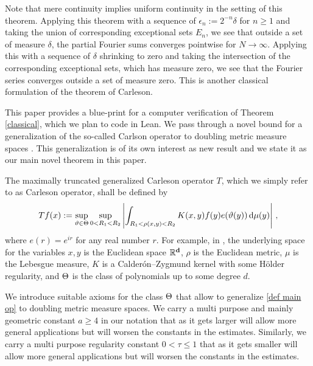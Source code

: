 Note that mere continuity implies uniform continuity
in the setting of this theorem. Applying this theorem
with a sequence of $\epsilon_n:= 2^{-n}\delta$ for $n\ge 1$
and taking the union of corresponding exceptional sets $E_n$, we see that
outside a set of measure $\delta$, the partial Fourier sums
converges pointwise for $N\to \infty$. Applying this with a sequence
of $\delta$ shrinking to zero and taking the intersection of the corresponding exceptional
sets, which has measure zero, we see that the Fourier series converges outside
a set of measure zero. This is another classical formulation  of the theorem of Carleson.

This paper provides a blue-print for a computer verification of Theorem \ref{classical}, which we plan to code in Lean.
We pass through a novel bound for a
generalization of the so-called Carlson operator
to doubling metric measure spaces . This generalization is of its own interest as new result and we state it as our main novel theorem in this paper.

The maximally truncated generalized Carleson operator $T$, which we  simply refer to as Carleson operator, shall be defined by
 \begin{equation}
        \label{def main op}
        Tf(x):=\sup_{\vartheta\in\Theta} \sup_{0 < R_1 < R_2}\left| \int_{R_1 <  \rho(x,y) < R_2}  K(x,y) f(y) e(\vartheta(y)) \, \mathrm{d}\mu(y) \right|\, ,
\end{equation}
where $e(r)=e^{ir}$ for any real number $r$.
For example, in
\cite{zk-polynomial}, the underlying space for the variables $x,y$ is the Euclidean space $\mathbb{R}^{\bf d}$, $\rho$ is the Euclidean metric, $\mu$ is the Lebesgue measure,
$K$ is a Calder\'on--Zygmund kernel with some H\"older regularity,
and $\Theta$ is the
class of  polynomials up to some degree $d$.


We introduce suitable axioms for the class $\Theta$
that allow to generalize \eqref{def main op} to doubling metric measure spaces.
We carry a multi purpose and mainly geometric constant $a\ge 4$ in our notation that as it gets larger will allow more general applications but will worsen the constants in the estimates.
Similarly, we carry a multi purpose regularity constant $0<\tau\le 1$ that as it gets smaller will allow more general applications but will worsen the constants in the estimates.

